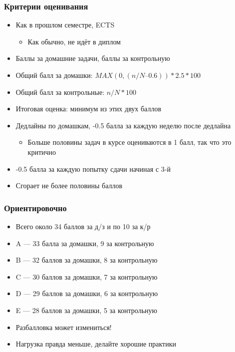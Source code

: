 \documentclass[xetex,mathserif,serif]{beamer}
\begin{document}
    \begin{frame}
        \frametitle{Критерии оценивания}
        \begin{itemize}
            \item Как в прошлом семестре, ECTS
            \begin{itemize}
                \item Как обычно, не идёт в диплом
            \end{itemize}
            \item Баллы за домашние задачи, баллы за контрольную
            \item Общий балл за домашки: $MAX(0, (n/N – 0.6)) * 2.5 * 100$
            \item Общий балл за контрольные: $n/N * 100$
            \item Итоговая оценка: минимум из этих двух баллов
            \item Дедлайны по домашкам, -0.5 балла за каждую неделю после дедлайна
            \begin{itemize}
                \item Больше половины задач в курсе оцениваются в 1 балл, так что это критично
            \end{itemize}
            \item -0.5 балла за каждую попытку сдачи начиная с 3-й
            \item Сгорает не более половины баллов
        \end{itemize}
    \end{frame}

    \begin{frame}
        \frametitle{Ориентировочно}
        \begin{itemize}
            \item Всего около 34 баллов за д/з и по 10 за к/р
            \item A --- 33 балла за домашки, 9 за контрольную
            \item B --- 32 баллов за домашки, 8 за контрольную
            \item C --- 30 баллов за домашки, 7 за контрольную
            \item D --- 29 баллов за домашки, 6 за контрольную
            \item E --- 28 баллов за домашки, 5 за контрольную
        \end{itemize}
        
        \vspace{0.5cm}

        \begin{itemize}
            \item Разбалловка может измениться!
            \item Нагрузка правда меньше, делайте хорошие практики
        \end{itemize}
    \end{frame}
\end{document}

